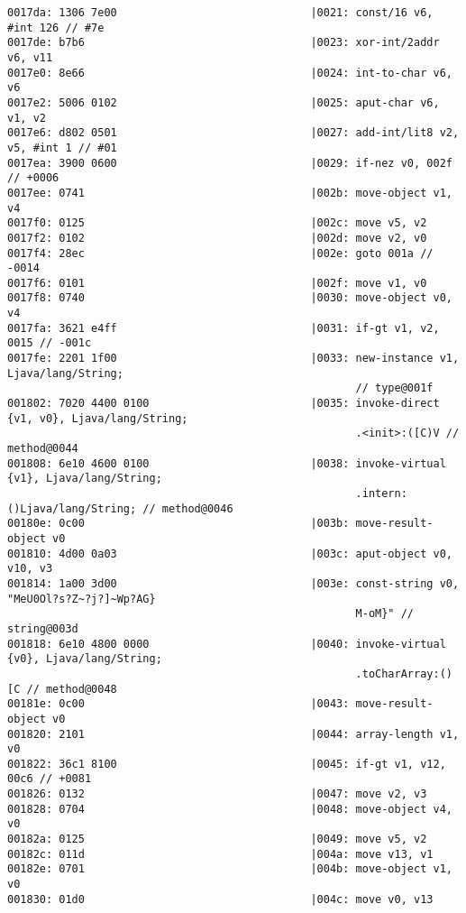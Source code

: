 \begin{lstlisting}
0017da: 1306 7e00                              |0021: const/16 v6, #int 126 // #7e
0017de: b7b6                                   |0023: xor-int/2addr v6, v11
0017e0: 8e66                                   |0024: int-to-char v6, v6
0017e2: 5006 0102                              |0025: aput-char v6, v1, v2
0017e6: d802 0501                              |0027: add-int/lit8 v2, v5, #int 1 // #01
0017ea: 3900 0600                              |0029: if-nez v0, 002f // +0006
0017ee: 0741                                   |002b: move-object v1, v4
0017f0: 0125                                   |002c: move v5, v2
0017f2: 0102                                   |002d: move v2, v0
0017f4: 28ec                                   |002e: goto 001a // -0014
0017f6: 0101                                   |002f: move v1, v0
0017f8: 0740                                   |0030: move-object v0, v4
0017fa: 3621 e4ff                              |0031: if-gt v1, v2, 0015 // -001c
0017fe: 2201 1f00                              |0033: new-instance v1, Ljava/lang/String;
                                                      // type@001f
001802: 7020 4400 0100                         |0035: invoke-direct {v1, v0}, Ljava/lang/String;
                                                      .<init>:([C)V // method@0044
001808: 6e10 4600 0100                         |0038: invoke-virtual {v1}, Ljava/lang/String;
                                                      .intern:()Ljava/lang/String; // method@0046
00180e: 0c00                                   |003b: move-result-object v0
001810: 4d00 0a03                              |003c: aput-object v0, v10, v3
001814: 1a00 3d00                              |003e: const-string v0, "MeU0Ol?s?Z~?j?]~Wp?AG}
                                                      M-oM}" // string@003d
001818: 6e10 4800 0000                         |0040: invoke-virtual {v0}, Ljava/lang/String;
                                                      .toCharArray:()[C // method@0048
00181e: 0c00                                   |0043: move-result-object v0
001820: 2101                                   |0044: array-length v1, v0
001822: 36c1 8100                              |0045: if-gt v1, v12, 00c6 // +0081
001826: 0132                                   |0047: move v2, v3
001828: 0704                                   |0048: move-object v4, v0
00182a: 0125                                   |0049: move v5, v2
00182c: 011d                                   |004a: move v13, v1
00182e: 0701                                   |004b: move-object v1, v0
001830: 01d0                                   |004c: move v0, v13

\end{lstlisting}
